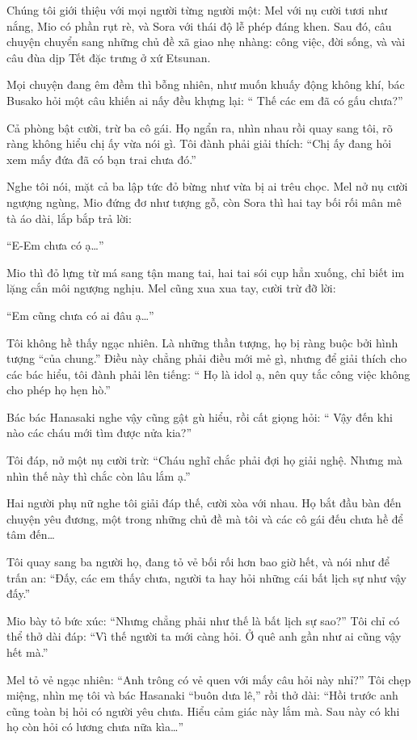 \documentclass[../main.tex]{subfiles}
\begin{document}
Chúng tôi giới thiệu với mọi người từng người một: Mel với nụ cười tươi như nắng, Mio có phần rụt rè, và Sora với thái độ lễ phép đáng khen. Sau đó, câu chuyện chuyển sang những chủ đề xã giao nhẹ nhàng: công việc, đời sống, và vài câu đùa dịp Tết đặc trưng ở xứ Etsunan.

Mọi chuyện đang êm đềm thì bỗng nhiên, như muốn khuấy động không khí, bác Busako hỏi một câu khiến ai nấy đều khựng lại: ``{\color{red} Thế các em đã có gấu chưa?}''

Cả phòng bật cười, trừ ba cô gái. Họ ngẩn ra, nhìn nhau rồi quay sang tôi, rõ ràng không hiểu chị ấy vừa nói gì. Tôi đành phải giải thích: ``Chị ấy đang hỏi xem mấy đứa đã có bạn trai chưa đó.''

Nghe tôi nói, mặt cả ba lập tức đỏ bừng như vừa bị ai trêu chọc. Mel nở nụ cười ngượng ngùng, Mio đứng đơ như tượng gỗ, còn Sora thì hai tay bối rối mân mê tà áo dài, lắp bắp trả lời:

``E-Em chưa có ạ\dots''

Mio thì đỏ lựng từ má sang tận mang tai, hai tai sói cụp hẳn xuống, chỉ biết im lặng cắn môi ngượng nghịu. Mel cũng xua xua tay, cười trừ đỡ lời:

``Em cũng chưa có ai đâu ạ\dots''

Tôi không hề thấy ngạc nhiên. Là những thần tượng, họ bị ràng buộc bởi hình tượng ``của chung.'' Điều này chẳng phải điều mới mẻ gì, nhưng để giải thích cho các bác hiểu, tôi đành phải lên tiếng: ``{\color{red} Họ là idol ạ, nên quy tắc công việc không cho phép họ hẹn hò.}''

Bác bác Hanasaki nghe vậy cũng gật gù hiểu, rồi cất giọng hỏi: ``{\color{red} Vậy đến khi nào các cháu mới tìm được nửa kia?}''

Tôi đáp, nở một nụ cười trừ: ``{\color{red}Cháu nghĩ chắc phải đợi họ giải nghệ. Nhưng mà nhìn thế này thì chắc còn lâu lắm ạ.}''

Hai người phụ nữ nghe tôi giải đáp thế, cười xòa với nhau. Họ bắt đầu bàn đến chuyện yêu đương, một trong những chủ đề mà tôi và các cô gái đếu chưa hề để tâm đến\dots

Tôi quay sang ba người họ, đang tỏ vẻ bối rối hơn bao giờ hết, và nói như để trấn an: ``Đấy, các em thấy chưa, người ta hay hỏi những cái bất lịch sự như vậy đấy.''

Mio bày tỏ bức xúc: ``Nhưng chẳng phải như thế là bất lịch sự sao?'' Tôi chỉ có thể thở dài đáp: ``Vì thế người ta mới càng hỏi. Ở quê anh gần như ai cũng vậy hết mà.''

Mel tỏ vẻ ngạc nhiên: ``Anh trông có vẻ quen với mấy câu hỏi này nhỉ?'' Tôi chẹp miệng, nhìn mẹ tôi và bác Hasanaki ``buôn dưa lê,'' rồi thở dài: ``Hồi trước anh cũng toàn bị hỏi có người yêu chưa. Hiểu cảm giác này lắm mà. Sau này có khi họ còn hỏi có lương chưa nữa kìa\dots''
\end{document}
